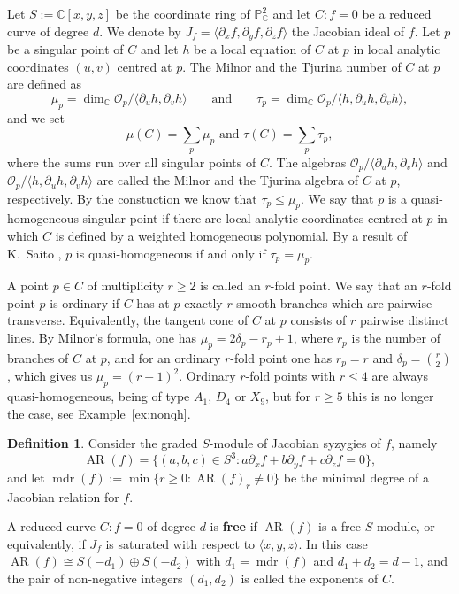 \documentclass[11pt]{amsart}
\theoremstyle{definition}
\newtheorem{definition}[theorem]{Definition}
\numberwithin{equation}{section}
\newcommand{\PP}{\mathbb{P}}
\newcommand{\CC}{\mathbb{C}}
\newcommand{\cO}{\mathcal{O}}
\newcommand{\gadd}[1]{#1}
\DeclareMathOperator{\AR}{AR}
\DeclareMathOperator{\mdr}{mdr}
\begin{document}
Let $S:=\CC[x,y,z]$ be the coordinate ring of $\PP^2_\CC$ and let $C\colon f=0$ be a reduced curve of degree $d$.
We denote by $J_f=\langle\partial_xf,\partial_yf,\partial_zf\rangle$ the Jacobian ideal of $f$. Let $p$ be a singular point of $C$ and let $h$ be a local equation of $C$ at $p$ in local analytic coordinates $(u,v)$ centred at $p$.
The Milnor and the Tjurina number of $C$ at $p$ are defined as
\[
\mu_p=\dim_\CC\cO_p/\langle\partial_uh,\partial_vh\rangle\qquad\text{and}\qquad\tau_p=\dim_\CC\cO_p/\langle h,\partial_uh,\partial_vh\rangle,
\]
and we set 
$$\mu(C)=\sum_p\mu_p \text{ and }\tau(C)=\sum_p\tau_p,$$ where the sums run over all singular points of $C$.
The algebras $\cO_p/\langle\partial_uh,\partial_vh\rangle$ and $\cO_p/\langle h,\partial_uh,\partial_vh\rangle$ are called the Milnor and the Tjurina algebra of $C$ at $p$, respectively.
By the constuction we know that $\tau_p\le\mu_p$.
We say that $p$ is a quasi-homogeneous singular point if there are local analytic coordinates centred at $p$ in which $C$ is defined by a weighted homogeneous polynomial.
By a result of K.~Saito \cite{Sa71}, $p$ is quasi-homogeneous if and only if $\tau_p=\mu_p$.

A point $p\in C$ of multiplicity $r\ge2$ is called an $r$-fold point.
We say that an $r$-fold point $p$ is ordinary if $C$ has at $p$ exactly $r$ smooth branches which are pairwise transverse.
Equivalently, the tangent cone of $C$ at $p$ consists of $r$ pairwise distinct lines.
By Milnor's formula, one has $\mu_p=2\delta_p-\gadd{r_p}+1$\gadd{, where $r_p$ is the number of branches of $C$ at $p$}, and for an ordinary $r$-fold point \gadd{one has $r_p=r$ and $\delta_p=\binom r2$, which} gives us $\mu_p=(r-1)^2$.
Ordinary $r$-fold points with $r\le4$ are always quasi-homogeneous, being of type $A_1$, $D_4$ or $X_9$, but for $r\ge5$ this is no longer the case, see Example~\ref{ex:nonqh}.

\begin{definition}
Consider the graded $S$-module of Jacobian syzygies of $f$, namely
\[
\AR(f)=\{(a,b,c)\in S^3\colon a\partial_xf+b\partial_yf+c\partial_zf=0\},
\]
and let $\mdr(f):=\min\{r\ge0\colon\AR(f)_r\neq0\}$ be the minimal degree of a Jacobian relation for $f$.

A reduced curve $C\colon f=0$ of degree $d$ is \textbf{free} if $\AR(f)$ is a free $S$-module, or equivalently, if $J_f$ is saturated with respect to $\langle x,y,z\rangle$. In this case $\AR(f)\cong S(-d_1)\oplus S(-d_2)$ with $d_1=\mdr(f)$ and $d_1+d_2=d-1$, and the pair of non-negative integers $(d_1,d_2)$ is called the exponents of $C$.
\end{definition}
\end{document}
